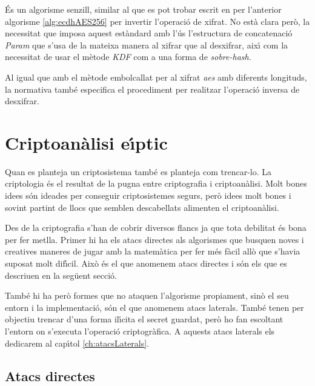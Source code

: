 \documentclass[12pt,twoside,catalan,a4paper]{book}%
\numberwithin{figure}{section}		%
\theoremstyle{definition}   			%
\theoremstyle{saltolinea}   			%
\begin{document}
\'Es un algorisme senzill, similar al que es pot trobar escrit en \cite{BM06} per l'anterior algorisme \ref{alg:ecdhAES256} per invertir l'operaci\'o de xifrat. No est\`a clara per\`o, la necessitat que imposa aquest est\`andard amb l'\'us l'estructura de concatenaci\'o \emph{Param} que s'usa de la mateixa manera al xifrar que al desxifrar, aix\'{\i} com la necessitat de usar el m\`etode \emph{KDF} com a una forma de \emph{sobre-hash}.

Al igual que amb el m\`etode embolcallat per al xifrat \emph{aes} amb diferents longituds, la normativa \cite{3394} tamb\'e especifica el procediment per realitzar l'operaci\'o inversa de desxifrar.



\section{Criptoan\`alisi e\lgem{}\'{\i}ptic}

Quan es planteja un criptosistema tamb\'e es planteja com trencar-lo. La criptologia \'es el resultat de la pugna entre criptografia i criptoan\`alisi. Molt bones idees s\'on ideades per conseguir criptosistemes segurs, per\`o idees molt bones i sovint partint de llocs que semblen descabellats alimenten el criptoan\`alisi.

Des de la criptografia s'han de cobrir diversos flancs ja que tota debilitat \'es bona per fer metlla. Primer hi ha els atacs directes als algorismes que busquen noves i creatives maneres de jugar amb la matem\`atica per fer m\'es f\`acil all\`o que s'havia suposat molt dif\'{\i}cil. Aix\`o \'es el que anomenem atacs directes i s\'on els que es descriuen en la seg\"uent secci\'o.

Tamb\'e hi ha per\`o formes que no ataquen l'algorisme propiament, sin\`o el seu entorn i la implementaci\'o, s\'on el que anomenem atacs laterals. Tamb\'e tenen per objectiu trencar d'una forma il\lgem{}\'{\i}cita el secret guardat, per\`o ho fan escoltant l'entorn on s'executa l'operaci\'o criptogr\`afica. A aquests atacs laterals els dedicarem al cap\'{\i}tol \ref{ch:atacsLaterals}.

\subsection{Atacs directes}\label{sec:atacsDirectes}
\end{document}
